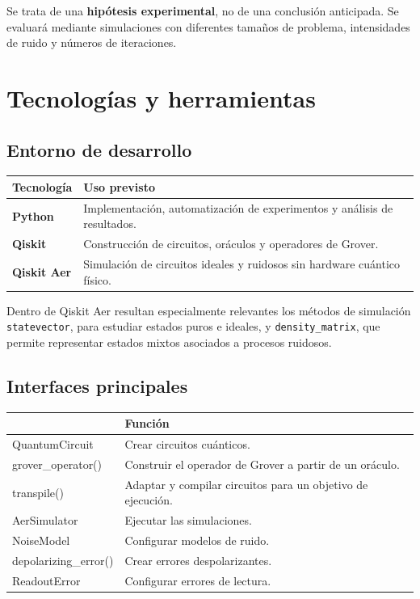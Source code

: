 \documentclass[11pt,a4paper]{article}
\begin{document}
Se trata de una \textbf{hipótesis experimental}, no de una conclusión anticipada. Se evaluará mediante simulaciones con diferentes tamaños de problema, intensidades de ruido y números de iteraciones.

\section{Tecnologías y herramientas}

\subsection{Entorno de desarrollo}

\begin{center}
\begin{tabularx}{\textwidth}{@{}>{\bfseries}p{2.8cm}X@{}}
\toprule
Tecnología & Uso previsto \\
\midrule
Python & Implementación, automatización de experimentos y análisis de resultados. \\
Qiskit & Construcción de circuitos, oráculos y operadores de Grover. \\
Qiskit Aer & Simulación de circuitos ideales y ruidosos sin hardware cuántico físico. \\
\bottomrule
\end{tabularx}
\end{center}

Dentro de Qiskit Aer resultan especialmente relevantes los métodos de simulación \texttt{statevector}, para estudiar estados puros e ideales, y \texttt{density\_matrix}, que permite representar estados mixtos asociados a procesos ruidosos.

\subsection{Interfaces principales}

\begin{center}
\begin{tabularx}{\textwidth}{@{}>{\ttfamily}p{4.3cm}X@{}}
\toprule
\multicolumn{1}{@{}l}{\textbf{Herramienta}} & \textbf{Función} \\
\midrule
QuantumCircuit & Crear circuitos cuánticos. \\
grover\_operator() & Construir el operador de Grover a partir de un oráculo. \\
transpile() & Adaptar y compilar circuitos para un objetivo de ejecución. \\
AerSimulator & Ejecutar las simulaciones. \\
NoiseModel & Configurar modelos de ruido. \\
depolarizing\_error() & Crear errores despolarizantes. \\
ReadoutError & Configurar errores de lectura. \\
\bottomrule
\end{tabularx}
\end{center}
\end{document}
